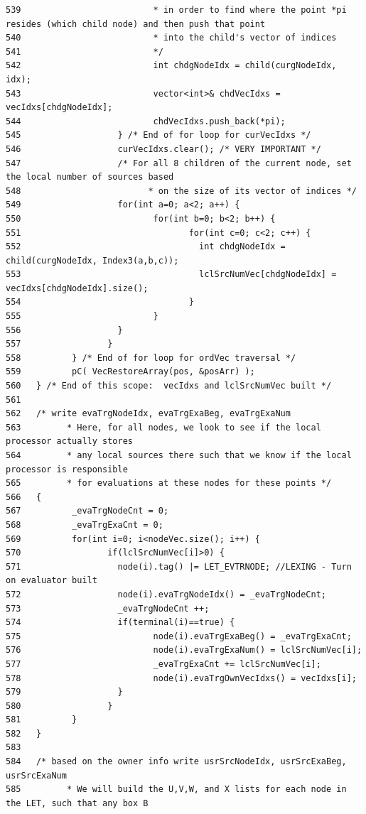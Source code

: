 \begin{verbatim}
539                          * in order to find where the point *pi resides (which child node) and then push that point
540                          * into the child's vector of indices
541                          */
542                          int chdgNodeIdx = child(curgNodeIdx, idx);
543                          vector<int>& chdVecIdxs = vecIdxs[chdgNodeIdx];
544                          chdVecIdxs.push_back(*pi);
545                   } /* End of for loop for curVecIdxs */
546                   curVecIdxs.clear(); /* VERY IMPORTANT */
547                   /* For all 8 children of the current node, set the local number of sources based
548                         * on the size of its vector of indices */
549                   for(int a=0; a<2; a++) {
550                          for(int b=0; b<2; b++) {
551                                 for(int c=0; c<2; c++) {
552                                   int chdgNodeIdx = child(curgNodeIdx, Index3(a,b,c));
553                                   lclSrcNumVec[chdgNodeIdx] = vecIdxs[chdgNodeIdx].size();
554                                 }
555                          }
556                   }
557                 }
558          } /* End of for loop for ordVec traversal */
559          pC( VecRestoreArray(pos, &posArr) );
560   } /* End of this scope:  vecIdxs and lclSrcNumVec built */
561   
562   /* write evaTrgNodeIdx, evaTrgExaBeg, evaTrgExaNum
563         * Here, for all nodes, we look to see if the local processor actually stores
564         * any local sources there such that we know if the local processor is responsible
565         * for evaluations at these nodes for these points */
566   {
567          _evaTrgNodeCnt = 0;
568          _evaTrgExaCnt = 0;
569          for(int i=0; i<nodeVec.size(); i++) {
570                 if(lclSrcNumVec[i]>0) {
571                   node(i).tag() |= LET_EVTRNODE; //LEXING - Turn on evaluator built
572                   node(i).evaTrgNodeIdx() = _evaTrgNodeCnt;
573                   _evaTrgNodeCnt ++;
574                   if(terminal(i)==true) {
575                          node(i).evaTrgExaBeg() = _evaTrgExaCnt;
576                          node(i).evaTrgExaNum() = lclSrcNumVec[i];
577                          _evaTrgExaCnt += lclSrcNumVec[i];
578                          node(i).evaTrgOwnVecIdxs() = vecIdxs[i];
579                   }
580                 }
581          }
582   }
583   
584   /* based on the owner info write usrSrcNodeIdx, usrSrcExaBeg, usrSrcExaNum
585         * We will build the U,V,W, and X lists for each node in the LET, such that any box B

\end{verbatim}
